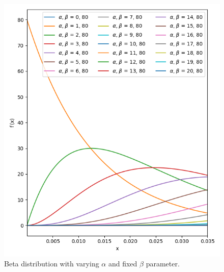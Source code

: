 \begin{figure}[!ht]%
    \centering
    \includegraphics[width=\linewidth]{images/beta1}
    \caption{Beta distribution with varying $\alpha$ and fixed $\beta$ parameter.}
    \label{fig:beta1}
\end{figure}%
